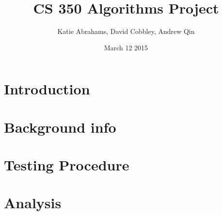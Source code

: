 \documentclass{article}
\title{CS 350 Algorithms Project}
\author{Katie Abrahams, David Cobbley, Andrew Qin}
\date{March 12 2015}
\begin{document}
\maketitle

\section{Introduction}

\section{Background info}

\section{Testing Procedure}

\section{Analysis}
\end{document}
